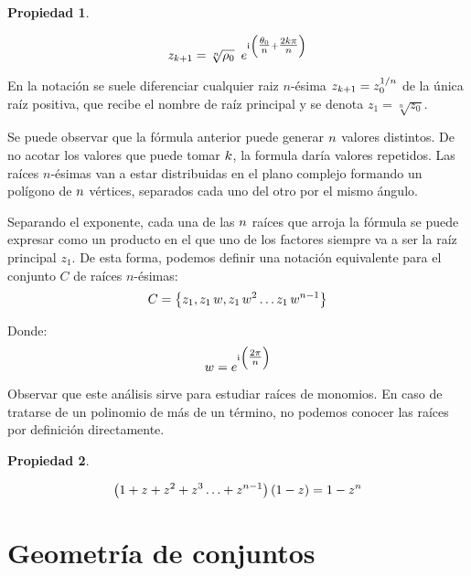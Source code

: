 \documentclass[a5paper,12pt,twoside]{book}
\newtheorem{prop}{{Propiedad}}[chapter]
\begin{document}
\begin{mdframed}[style=MyFrame1]
    \begin{prop}
    \end{prop}
    \begin{equation*}
        z_{k+1} = \sqrt[n]{\rho_0} \enspace e^{\mathrm{i}\mkern1mu \left( \tfrac{\theta_0}{n} + \tfrac{2 k \pi}{n} \right)}
    \end{equation*}
\end{mdframed}

En la notación se suele diferenciar cualquier raiz $n$-ésima $z_{k+1} = z_0^{1/n}$ de la única raíz positiva, que recibe el nombre de raíz principal y se denota $z_1=\sqrt[n]{z_0}$.

Se puede observar que la fórmula anterior puede generar $n$ valores distintos. De no acotar los valores que puede tomar $k$, la formula daría valores repetidos. Las raíces $n$-ésimas van a estar distribuidas en el plano complejo formando un polígono de $n$ vértices, separados cada uno del otro por el mismo ángulo.

Separando el exponente, cada una de las $n$ raíces que arroja la fórmula se puede expresar como un producto en el que uno de los factores siempre va a ser la raíz principal $z_1$. De esta forma, podemos definir una notación equivalente para el conjunto $C$ de raíces $n$-ésimas:
\begin{equation*}
    C = { \left\{ {z_1 , z_1 \, w , z_1 \, w^2 \ldots z_1 \, w^{n-1}} \right\} }
\end{equation*}

Donde:
\begin{equation*}
    w = e^{\mathrm{i}\mkern1mu \left( \tfrac{2 \pi}{n} \right)}
\end{equation*}

Observar que este análisis sirve para estudiar raíces de monomios. En caso de tratarse de un polinomio de más de un término, no podemos conocer las raíces por definición directamente.

\begin{mdframed}[style=MyFrame1]
    \begin{prop}
    \end{prop}
    \begin{equation*}
        \left( 1 + z + z^2 + z^3 \ldots + z^{n-1} \right) \left( 1 - z \right) = 1 - z^n
    \end{equation*}
\end{mdframed}


\section{Geometría de conjuntos}
\end{document}
